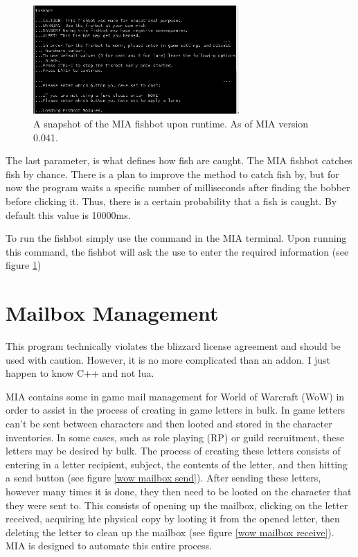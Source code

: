 \begin{figure}[h]
	\centering
	\includegraphics[width=0.7\textwidth]{Images/fishbot_MIA.png}
	\caption{A snapshot of the MIA fishbot upon runtime. As of MIA version 0.041.} \label{fishbot terminal}
\end{figure}

The last parameter,  is what defines how fish are caught. The MIA fishbot catches fish by chance. There is a plan to improve the method to catch fish by, but for now the program waits a specific number of milliseconds after finding the bobber before clicking it. Thus, there is a certain probability that a fish is caught. By default this value is 10000ms.

To run the fishbot simply use the  command in the MIA terminal. Upon running this command, the fishbot will ask the use to enter the required information (see figure \ref{fishbot terminal})

\section{Mailbox Management} \label{WoWMailbox}

\begin{note}
	This program technically violates the blizzard license agreement and should be used with caution. However, it is no more complicated than an addon. I just happen to know C++ and not lua.
\end{note}

MIA contains some in game mail management for World of Warcraft (WoW) in order to assist in the process of creating in game letters in bulk. In game letters can't be sent between characters and then looted and stored in the character inventories. In some cases, such as role playing (RP) or guild recruitment, these letters may be desired by bulk. The process of creating these letters consists of entering in a letter recipient, subject, the contents of the letter, and then hitting a send button (see figure \ref{wow mailbox send}). After sending these letters, however many times it is done, they then need to be looted on the character that they were sent to. This consists of opening up the mailbox, clicking on the letter received, acquiring hte physical copy by looting it from the opened letter, then deleting the letter to clean up the mailbox (see figure \ref{wow mailbox receive}). MIA is designed to automate this entire process.

